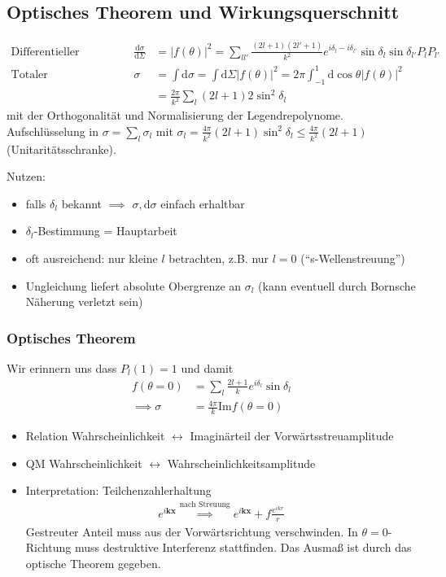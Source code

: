 \documentclass[11pt,a4paper]{report}
\begin{document}
\subsection{Optisches Theorem und Wirkungsquerschnitt}

\begin{align*}
    \text{Differentieller Wirkungsquerschnitt} && \frac{\mathrm{d} \sigma}{\mathrm{d} \Sigma} &= |f(\theta)|^2 = \sum_{l l'} \frac{(2 l + 1)(2 l' + 1)}{k^2} e^{i \delta_l - i \delta_{l'}} \sin \delta_l \sin \delta_{l'} P_l P_{l'} \\
    \text{Totaler Wirkungsquerschnitt} && \sigma &= \int \mathrm{d}\sigma = \int \mathrm{d} \Sigma |f(\theta)|^2 = 2\pi \int_{-1}^1 \mathrm{d}\cos \theta |f(\theta)|^2 \\
    &&&=\frac{2\pi}{k^2} \sum_l (2 l + 1) 2 \sin^2 \delta_l 
\end{align*}
mit der Orthogonalität und Normalisierung der Legendrepolynome.
Aufschlüsselung in $\sigma = \sum_l \sigma_l$ mit $\sigma_l = \frac{4\pi}{k^2} (2 l + 1) \sin^2  \delta_l \leq \frac{4\pi}{k^2} (2 l + 1)$ (Unitaritätsschranke).

Nutzen: 
\begin{itemize}
    \item falls $\delta_l$ bekannt $\implies$ $\sigma, \mathrm{d}\sigma$ einfach erhaltbar
    \item $\delta_l$-Bestimmung = Hauptarbeit
    \item oft ausreichend: nur kleine $l$ betrachten, z.B. nur $l=0$ (``s-Wellenstreuung'')
    \item Ungleichung liefert absolute Obergrenze an $\sigma_l$ (kann eventuell durch Bornsche Näherung verletzt sein)
\end{itemize}

\subsubsection{Optisches Theorem}

Wir erinnern uns dass $P_l(1) = 1$ und damit
\begin{align*}
    f(\theta = 0) &= \sum_l \frac{2 l + 1}{k} e^{i \delta_l} \sin \delta_l \\
    \implies \sigma &= \frac{4\pi}{k} \mathrm{Im} f(\theta = 0)
\end{align*}

\begin{itemize}
    \item Relation Wahrscheinlichkeit $\leftrightarrow$ Imaginärteil der Vorwärtsstreuamplitude
    \item QM Wahrscheinlichkeit $\leftrightarrow$ Wahrscheinlichkeitsamplitude
    \item Interpretation: Teilchenzahlerhaltung
    \begin{align*}
        e^{i \mathbf{k} \mathbf{x}} \stackrel{\text{nach Streuung}}{\implies} e^{i \mathbf{k} \mathbf{x}} + f \frac{e^{i k r}}{r}
    \end{align*}
    Gestreuter Anteil muss aus der Vorwärtsrichtung verschwinden. In $\theta=0$-Richtung muss destruktive Interferenz stattfinden.
    Das Ausmaß ist durch das optische Theorem gegeben.
\end{itemize}
\end{document}

